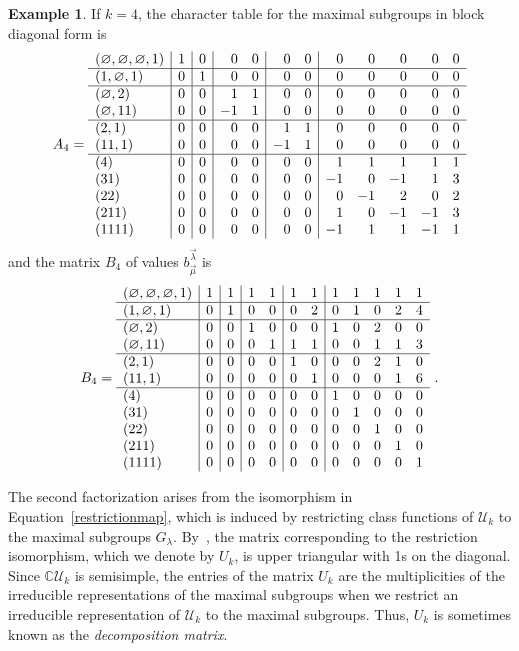 \documentclass[10pt]{amsart}
\theoremstyle{definition}
\newtheorem{example}[theorem]{Example}
\theoremstyle{remark}
\newcommand{\defncolor}{\color{darkred}}
\newcommand{\defn}[1]{{\defncolor\emph{#1}}} %
\newcommand{\CC}{\mathbb C}
\newcommand{\epart}{\text{\footnotesize$\varnothing$}}
\begin{document}
\begin{example}
If $k = 4$, the character table for the maximal
subgroups in block diagonal form is
$$
A_4 = \begin{array}{l|r|r|rr|rr|rrrrr}
(\epart, \epart, \epart, 1) & 1 & 0 & 0 & 0 & 0 & 0 & 0 & 0 & 0 & 0 & 0\\
\hline
(1, \epart, 1) &0 & 1 & 0 & 0 & 0 & 0 & 0 & 0 & 0 & 0 & 0\\
\hline
(\epart, 2) &0 & 0 & 1 & 1 & 0 & 0 & 0 & 0 & 0 & 0 & 0\\
(\epart, 11) &0 & 0 & -1 & 1 & 0 & 0 & 0 & 0 & 0 & 0 & 0\\
\hline
(2, 1) &0 & 0 & 0 & 0 & 1 & 1 & 0 & 0 & 0 & 0 & 0\\
(11, 1) &0 & 0 & 0 & 0 & -1 & 1 & 0 & 0 & 0 & 0 & 0\\
\hline
(4) &0 & 0 & 0 & 0 & 0 & 0 & 1 & 1 & 1 & 1 & 1\\
(31) &0 & 0 & 0 & 0 & 0 & 0 & -1 & 0 & -1 & 1 & 3\\
(22) &0 & 0 & 0 & 0 & 0 & 0 & 0 & -1 & 2 & 0 & 2\\
(211) &0 & 0 & 0 & 0 & 0 & 0 & 1 & 0 & -1 & -1 & 3\\
(1111) &0 & 0 & 0 & 0 & 0 & 0 & -1 & 1 & 1 & -1 & 1
\end{array}
$$
and the matrix
$B_4$ of values $b^{\vec{\lambda}}_{\vec{\mu}}$ is
$$
B_4 = \begin{array}{l|r|r|rr|rr|rrrrr}
(\epart, \epart, \epart, 1) & 1 & 1 & 1 & 1 & 1 & 1 & 1 & 1 & 1 & 1 & 1\\
\hline
(1, \epart, 1) &0 & 1 & 0 & 0 & 0 & 2 & 0 & 1 & 0 & 2 & 4\\
\hline
(\epart, 2) &0 & 0 & 1 & 0 & 0 & 0 & 1 & 0 & 2 & 0 & 0\\
(\epart, 11) &0 & 0 & 0 & 1 & 1 & 1 & 0 & 0 & 1 & 1 & 3\\
\hline
(2, 1) &0 & 0 & 0 & 0 & 1 & 0 & 0 & 0 & 2 & 1 & 0\\
(11, 1) &0 & 0 & 0 & 0 & 0 & 1 & 0 & 0 & 0 & 1 & 6\\
\hline
(4) &0 & 0 & 0 & 0 & 0 & 0 & 1 & 0 & 0 & 0 & 0\\
(31) &0 & 0 & 0 & 0 & 0 & 0 & 0 & 1 & 0 & 0 & 0\\
(22) &0 & 0 & 0 & 0 & 0 & 0 & 0 & 0 & 1 & 0 & 0\\
(211) &0 & 0 & 0 & 0 & 0 & 0 & 0 & 0 & 0 & 1 & 0\\
(1111) &0 & 0 & 0 & 0 & 0 & 0 & 0 & 0 & 0 & 0 & 1
\end{array}~.
$$
\end{example}

The second factorization arises from the isomorphism in
Equation~\eqref{restrictionmap}, which is induced by restricting class
functions of $\mathcal{U}_k$ to the maximal subgroups $G_\lambda$.
By~\cite[Theorem 6.5]{Steinberg.2016}, the matrix corresponding to the restriction isomorphism,
which we denote by $U_k$, is upper triangular with 1s on the diagonal. Since $\CC\mathcal{U}_k$
is semisimple, the entries of the matrix $U_k$ are the multiplicities of the
irreducible representations of the maximal subgroups when we restrict an
irreducible representation of $\mathcal{U}_k$ to the maximal subgroups.
Thus, $U_k$ is sometimes known as the \defn{decomposition matrix}.
\end{document}
